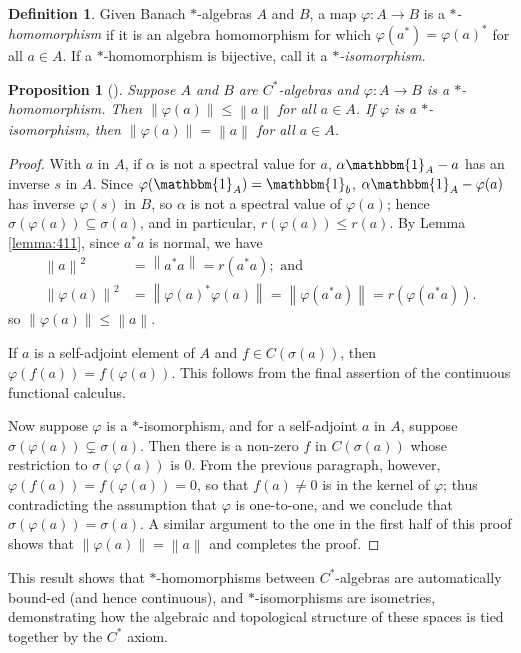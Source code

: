 \documentclass[11pt,a4paper]{report}
\theoremstyle{plain}
\newtheorem{prop}{Proposition}
\theoremstyle{definition}
\newtheorem{defn}{Definition}
\newcommand{\1}{\mathbbm{1}}
\renewcommand{\phi}{\varphi}
\newcommand{\spec}[1]{\sigma(#1)}
\begin{document}
\begin{defn}
	Given Banach $\ast$-algebras $A$ and $B$, a map $\phi:A\to B$ is a 
	\emph{$\ast$-homomorphism} if it is an algebra homomorphism for which 
	$\phi(a^\ast) = \phi(a)^\ast$ for all $a \in A$. If a $\ast$-homomorphism is 
	bijective, call it a \emph{$\ast$-isomorphism}.
\end{defn}
\begin{prop}[{\cite[4.1.8]{kadison83}}] \label{prop:homo}
	Suppose $A$ and $B$ are $C^\ast$-algebras and $\phi:A\to B$ is a 
	$\ast$-homomorphism. Then $\left\|\phi(a)\right\| \leq \left\|a\right\|$ for all 
	$a \in A$. If $\phi$ is a $\ast$-isomorphism, then $\left\|\phi(a)\right\| = 
	\left\|a\right\|$ for all $a \in A$.


\end{prop}
\begin{proof}
	With $a$ in $A$, if $\alpha$ is not a spectral value for $a$, $\alpha\1_A-a$ has 
	an inverse $s$ in $A$. Since $\phi(\1_A) =\1_b$, $\alpha \1_A-\phi(a)$ has 
	inverse $\phi(s)$ in $B$, so $\alpha$ is not a spectral value of $\phi(a)$; 
	hence $\spec {\phi(a)}\subseteq \spec a$, and in particular, $r(\phi(a))\leq 
	r(a)$. By Lemma \ref{lemma:411}, since $a^\ast a$ is normal, we have 
	\begin{align*}
		\left\|a\right\|^2			
					&=	\left\|a^\ast a\right\|   = 	r(a^\ast a);  \mbox{ and }			\\
		\left\|\phi(a)\right\|^2 &=\left\|\phi(a)^\ast\phi(a)\right\| = 
							 \left\|\phi(a^\ast a)\right\| = r(\phi(a^\ast a)).
	\end{align*}
	so $\left\|\phi(a)\right\|\leq \left\|a\right\|$.
	
	If $a$ is a self-adjoint element of $A$ and $f \in C(\spec a)$, then 
	$\phi(f(a))=f(\phi(a))$. This follows from the final assertion of the continuous 
	functional calculus.

	
	Now suppose $\phi$ is a $\ast$-isomorphism, and for a self-adjoint $a$ in $A$, 
	suppose $\spec{\phi(a)} \subsetneq \spec a$. Then there is a non-zero $f$ in 
	$C(\spec a)$ whose restriction to $\spec{\phi(a)}$ is 0. From the previous 
	paragraph, however, $\phi(f(a)) = f(\phi(a))=0$, so that $f(a)\not= 0$ is in the 
	kernel of $\phi$; thus contradicting the assumption that $\phi$ is one-to-one, 
	and we conclude that $\spec{\phi(a)} = \spec a$. A similar argument to the one 
	in the first half of this proof shows that $\left\|\phi(a)\right\| = 
	\left\|a\right\|$ and completes the proof.


\end{proof}
This result shows that $\ast$-homomorphisms between $C^\ast$-algebras are 
automatically bound-ed (and hence continuous), and $\ast$-isomorphisms are 
isometries, demonstrating how the algebraic and topological structure of these 
spaces is tied together by the $C^\ast$ axiom.
\end{document}
